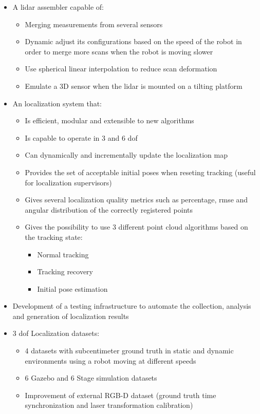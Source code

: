 \begin{itemize}
	\item A \gls{lidar} assembler capable of:
	\begin{itemize}
		\item Merging measurements from several sensors
		\item Dynamic adjust its configurations based on the speed of the robot in order to merge more scans when the robot is moving slower
		\item Use spherical linear interpolation to reduce scan deformation
		\item Emulate a 3D sensor when the \gls{lidar} is mounted on a tilting platform
	\end{itemize}

	\item An localization system that:
	\begin{itemize}
		\item Is efficient, modular and extensible to new algorithms
		\item Is capable to operate in 3 and 6 \gls{dof}
		\item Can dynamically and incrementally update the localization map
		\item Provides the set of acceptable initial poses when reseting tracking (useful for localization supervisors)
		\item Gives several localization quality metrics such as percentage, \gls{rmse} and angular distribution of the correctly registered points
		\item Gives the possibility to use 3 different point cloud algorithms based on the tracking state:
			\begin{itemize}
				\item Normal tracking
				\item Tracking recovery
				\item Initial pose estimation
			\end{itemize}
	\end{itemize}

	\item Development of a testing infrastructure to automate the collection, analysis and generation of localization results

	\item 3 \gls{dof} Localization datasets:
	\begin{itemize}
		\item 4 datasets with subcentimeter ground truth in static and dynamic environments using a robot moving at different speeds
		\item 6 Gazebo and 6 Stage simulation datasets
		\item Improvement of external RGB-D dataset (ground truth time synchronization and laser transformation calibration)
	\end{itemize}


\end{itemize}
